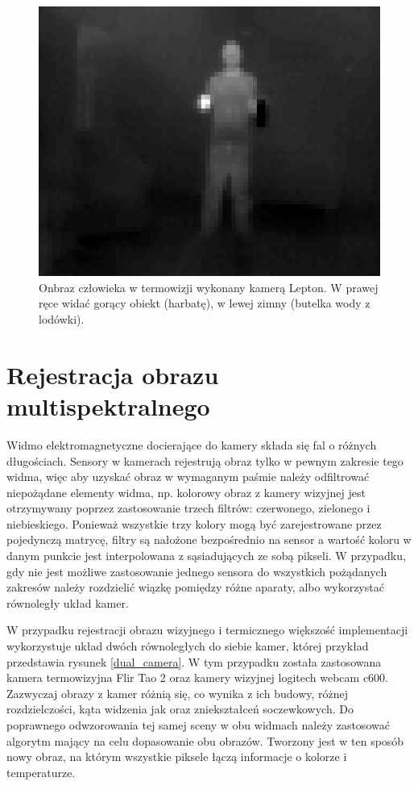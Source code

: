 

\begin{figure}
\centering
\includegraphics[width=0.5\linewidth]{images/leptonTermalImage.png}
\caption[Obraz człowieka w termowizji wykonany kamerą Lepton.]{Onbraz człowieka w termowizji wykonany kamerą Lepton. W prawej ręce widać gorący obiekt (harbatę), w lewej zimny (butelka wody z lodówki).}
\label{fig:leptonTermalImage}
\end{figure}



\section{Rejestracja obrazu multispektralnego}

Widmo elektromagnetyczne docierające do kamery składa się fal o różnych długościach. Sensory w kamerach rejestrują obraz tylko w pewnym zakresie tego widma, więc aby uzyskać obraz w wymaganym paśmie należy odfiltrować niepożądane elementy widma, np. kolorowy obraz z kamery wizyjnej jest otrzymywany poprzez zastosowanie trzech filtrów: czerwonego, zielonego i niebieskiego. Ponieważ wszystkie trzy kolory mogą być zarejestrowane przez pojedynczą matrycę, filtry są nałożone bezpośrednio na sensor a wartość koloru w danym punkcie jest interpolowana z sąsiadujących ze sobą pikseli. W przypadku, gdy nie jest możliwe zastosowanie jednego sensora do wszystkich pożądanych zakresów należy rozdzielić wiązkę pomiędzy różne aparaty, albo wykorzystać równoległy układ kamer. 

W przypadku rejestracji obrazu wizyjnego i termicznego większość implementacji wykorzystuje układ dwóch równoległych do siebie kamer, której przykład przedstawia rysunek \ref{dual_camera}. W tym przypadku została zastosowana kamera termowizyjna Flir Tao 2 oraz kamery wizyjnej logitech webcam c600. %
Zazwyczaj obrazy z kamer różnią się, co wynika z ich budowy, różnej rozdzielczości, kąta widzenia jak oraz zniekształceń soczewkowych.
Do poprawnego odwzorowania tej samej sceny w obu widmach należy zastosować algorytm mający na celu dopasowanie obu obrazów. Tworzony jest w ten sposób nowy obraz, na którym wszystkie piksele łączą informacje o kolorze i temperaturze.

